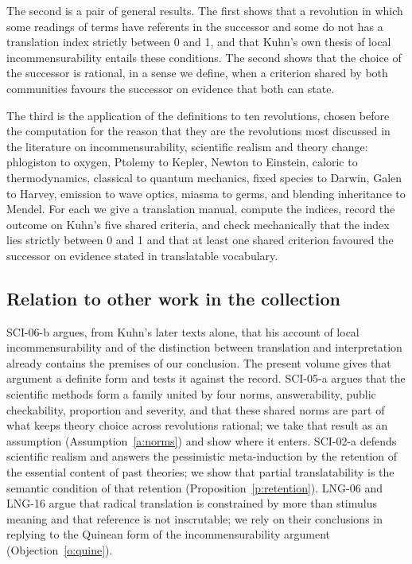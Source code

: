 \documentclass{situationist-preprint}
\begin{document}
The second is a pair of general results. The first shows that a revolution in which some readings of terms have referents in the successor and some do not has a translation index strictly between 0 and 1, and that Kuhn's own thesis of local incommensurability entails these conditions. The second shows that the choice of the successor is rational, in a sense we define, when a criterion shared by both communities favours the successor on evidence that both can state.

The third is the application of the definitions to ten revolutions, chosen before the computation for the reason that they are the revolutions most discussed in the literature on incommensurability, scientific realism and theory change: phlogiston to oxygen, Ptolemy to Kepler, Newton to Einstein, caloric to thermodynamics, classical to quantum mechanics, fixed species to Darwin, Galen to Harvey, emission to wave optics, miasma to germs, and blending inheritance to Mendel. For each we give a translation manual, compute the indices, record the outcome on Kuhn's five shared criteria, and check mechanically that the index lies strictly between 0 and 1 and that at least one shared criterion favoured the successor on evidence stated in translatable vocabulary.

\subsection{Relation to other work in the collection}

SCI-06-b argues, from Kuhn's later texts alone, that his account of local incommensurability and of the distinction between translation and interpretation already contains the premises of our conclusion. The present volume gives that argument a definite form and tests it against the record. SCI-05-a argues that the scientific methods form a family united by four norms, answerability, public checkability, proportion and severity, and that these shared norms are part of what keeps theory choice across revolutions rational; we take that result as an assumption (Assumption~\ref{a:norms}) and show where it enters. SCI-02-a defends scientific realism and answers the pessimistic meta-induction by the retention of the essential content of past theories; we show that partial translatability is the semantic condition of that retention (Proposition~\ref{p:retention}). LNG-06 and LNG-16 argue that radical translation is constrained by more than stimulus meaning and that reference is not inscrutable; we rely on their conclusions in replying to the Quinean form of the incommensurability argument (Objection~\ref{o:quine}).
\end{document}
